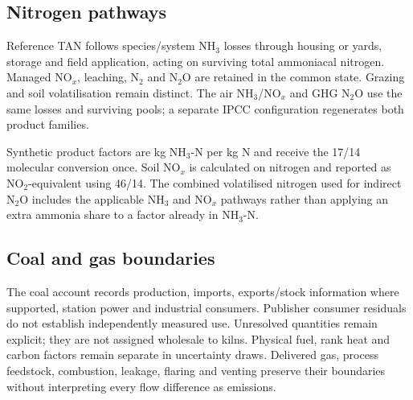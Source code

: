 \subsection{Nitrogen pathways}
Reference TAN follows species/system NH$_3$ losses through housing or yards, storage and field application, acting on surviving total ammoniacal nitrogen. Managed NO$_x$, leaching, N$_2$ and N$_2$O are retained in the common state. Grazing and soil volatilisation remain distinct. The air NH$_3$/NO$_x$ and GHG N$_2$O use the same losses and surviving pools; a separate IPCC configuration regenerates both product families.

Synthetic product factors are kg NH$_3$-N per kg N and receive the 17/14 molecular conversion once. Soil NO$_x$ is calculated on nitrogen and reported as NO$_2$-equivalent using 46/14. The combined volatilised nitrogen used for indirect N$_2$O includes the applicable NH$_3$ and NO$_x$ pathways rather than applying an extra ammonia share to a factor already in NH$_3$-N.

\subsection{Coal and gas boundaries}
The coal account records production, imports, exports/stock information where supported, station power and industrial consumers. Publisher consumer residuals do not establish independently measured use. Unresolved quantities remain explicit; they are not assigned wholesale to kilns. Physical fuel, rank heat and carbon factors remain separate in uncertainty draws. Delivered gas, process feedstock, combustion, leakage, flaring and venting preserve their boundaries without interpreting every flow difference as emissions.
